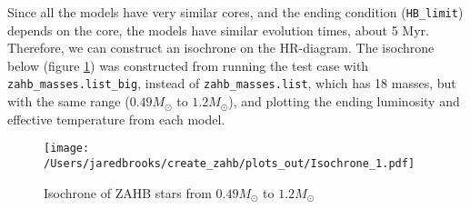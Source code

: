 \documentclass{article}
\begin{document}
        \pagebreak

        Since all the models have very similar cores, and the ending condition (\texttt{HB\_limit}) depends on the core, the models have similar evolution times, about 5 Myr.  Therefore, we can construct an isochrone on the HR-diagram.  The isochrone below (figure \ref{fig:8}) was constructed from running the test case with \texttt{zahb\_masses.list\_big}, instead of \texttt{zahb\_masses.list}, which has 18 masses, but with the same range ($0.49 M_\odot$ to $1.2 M_\odot$), and plotting the ending luminosity and effective temperature from each model.

        \begin{figure}[H]
          \centering
          \texttt{[image: /Users/jaredbrooks/create\_zahb/plots\_out/Isochrone\_1.pdf]}
          \caption{Isochrone of ZAHB stars from $0.49 M_\odot$ to $1.2 M_\odot$}
          \label{fig:8}
        \end{figure}
\end{document}
